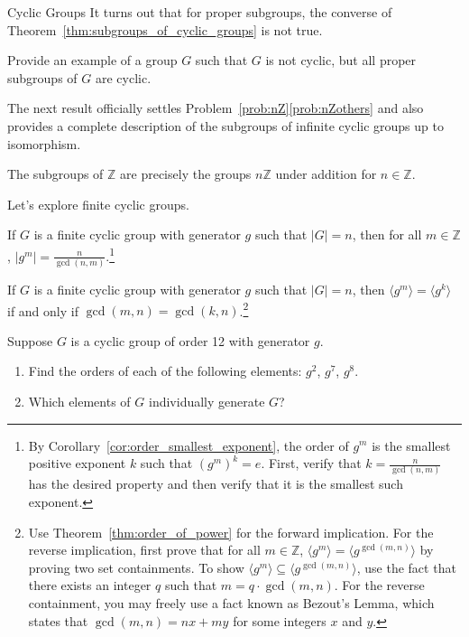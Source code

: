 \begin{section}{Cyclic Groups}
It turns out that for proper subgroups, the converse of Theorem~\ref{thm:subgroups_of_cyclic_groups} is not true.

\begin{problem}
Provide an example of a group $G$ such that $G$ is not cyclic, but all proper subgroups of $G$ are cyclic.
\end{problem}

The next result officially settles Problem~\ref{prob:nZ}\ref{prob:nZothers} and also provides a complete description of the subgroups of infinite cyclic groups up to isomorphism.

\begin{corollary}\label{cor:subgroups_of_Z}
The subgroups of $\mathbb{Z}$ are precisely the groups $n\mathbb{Z}$ under addition for $n\in \mathbb{Z}$.
\end{corollary}

Let's explore finite cyclic groups.

\begin{theorem}\label{thm:order_of_power}
If $G$ is a finite cyclic group with generator $g$ such that $|G|=n$, then for all $m\in\mathbb{Z}$, $\displaystyle |g^m|=\frac{n}{\gcd(n,m)}$.\footnote{By Corollary~\ref{cor:order_smallest_exponent}, the order of $g^m$ is the smallest positive exponent $k$ such that $(g^m)^k=e$. First, verify that $k=\frac{n}{\gcd(n,m)}$ has the desired property and then verify that it is the smallest such exponent.}
\end{theorem}

\begin{theorem}
If $G$ is a finite cyclic group with generator $g$ such that $|G|=n$, then $\langle g^m\rangle=\langle g^k\rangle$ if and only if $\gcd(m,n)=\gcd(k,n)$.\footnote{Use Theorem~\ref{thm:order_of_power} for the forward implication. For the reverse implication, first prove that for all $m\in\mathbb{Z}$, $\langle g^m\rangle=\langle g^{\gcd(m,n)}\rangle$ by proving two set containments. To show $\langle g^m\rangle\subseteq \langle g^{\gcd(m,n)}\rangle$, use the fact that there exists an integer $q$ such that $m=q\cdot \gcd(m,n)$. For the reverse containment, you may freely use a fact known as Bezout's Lemma, which states that $\gcd(m,n)=nx+my$ for some integers $x$ and $y$.}
\end{theorem}

\begin{problem}
Suppose $G$ is a cyclic group of order 12 with generator $g$. 
\begin{enumerate}[label=\rm{(\alph*)}]
\item Find the orders of each of the following elements: $g^2$, $g^7$, $g^8$.
\item Which elements of $G$ individually generate $G$?
\end{enumerate}
\end{problem}


\end{section}
